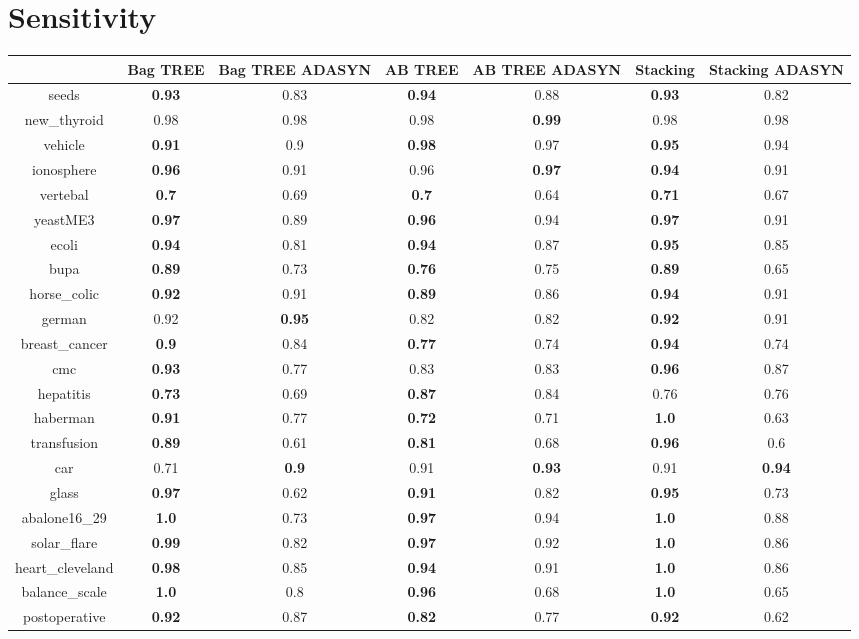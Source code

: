 \documentclass{article}%
\begin{document}
%
\section*{Sensitivity}%
\begin{tabular}{c|cccccc}%
&Bag TREE&Bag TREE ADASYN&AB TREE&AB TREE ADASYN&Stacking&Stacking ADASYN\\%
\hline%
seeds&\textbf{0.93}&0.83&\textbf{0.94}&0.88&\textbf{0.93}&0.82\\%
new\_thyroid&0.98&0.98&0.98&\textbf{0.99}&0.98&0.98\\%
vehicle&\textbf{0.91}&0.9&\textbf{0.98}&0.97&\textbf{0.95}&0.94\\%
ionosphere&\textbf{0.96}&0.91&0.96&\textbf{0.97}&\textbf{0.94}&0.91\\%
vertebal&\textbf{0.7}&0.69&\textbf{0.7}&0.64&\textbf{0.71}&0.67\\%
yeastME3&\textbf{0.97}&0.89&\textbf{0.96}&0.94&\textbf{0.97}&0.91\\%
ecoli&\textbf{0.94}&0.81&\textbf{0.94}&0.87&\textbf{0.95}&0.85\\%
bupa&\textbf{0.89}&0.73&\textbf{0.76}&0.75&\textbf{0.89}&0.65\\%
horse\_colic&\textbf{0.92}&0.91&\textbf{0.89}&0.86&\textbf{0.94}&0.91\\%
german&0.92&\textbf{0.95}&0.82&0.82&\textbf{0.92}&0.91\\%
breast\_cancer&\textbf{0.9}&0.84&\textbf{0.77}&0.74&\textbf{0.94}&0.74\\%
cmc&\textbf{0.93}&0.77&0.83&0.83&\textbf{0.96}&0.87\\%
hepatitis&\textbf{0.73}&0.69&\textbf{0.87}&0.84&0.76&0.76\\%
haberman&\textbf{0.91}&0.77&\textbf{0.72}&0.71&\textbf{1.0}&0.63\\%
transfusion&\textbf{0.89}&0.61&\textbf{0.81}&0.68&\textbf{0.96}&0.6\\%
car&0.71&\textbf{0.9}&0.91&\textbf{0.93}&0.91&\textbf{0.94}\\%
glass&\textbf{0.97}&0.62&\textbf{0.91}&0.82&\textbf{0.95}&0.73\\%
abalone16\_29&\textbf{1.0}&0.73&\textbf{0.97}&0.94&\textbf{1.0}&0.88\\%
solar\_flare&\textbf{0.99}&0.82&\textbf{0.97}&0.92&\textbf{1.0}&0.86\\%
heart\_cleveland&\textbf{0.98}&0.85&\textbf{0.94}&0.91&\textbf{1.0}&0.86\\%
balance\_scale&\textbf{1.0}&0.8&\textbf{0.96}&0.68&\textbf{1.0}&0.65\\%
postoperative&\textbf{0.92}&0.87&\textbf{0.82}&0.77&\textbf{0.92}&0.62\\%
\end{tabular}
\end{document}
